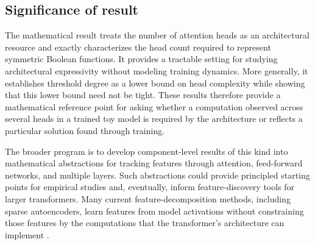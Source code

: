 \documentclass{article}
\theoremstyle{definition}
\theoremstyle{plain}
\begin{document}
\subsection{Significance of result}


%
%

The mathematical result treats the number of attention heads as an architectural resource and exactly characterizes the head count required to represent symmetric Boolean functions. It provides a tractable setting for studying architectural expressivity without modeling training dynamics. More generally, it establishes threshold degree as a lower bound on head complexity while showing that this lower bound need not be tight. These results therefore provide a mathematical reference point for asking whether a computation observed across several heads in a trained toy model is required by the architecture or reflects a particular solution found through training.

The broader program is to develop component-level results of this kind into mathematical abstractions for tracking features through attention, feed-forward networks, and multiple layers. Such abstractions could provide principled starting points for empirical studies and, eventually, inform feature-discovery tools for larger transformers. Many current feature-decomposition methods, including sparse autoencoders, learn features from model activations without constraining those features by the computations that the transformer's architecture can implement \citep{cunningham2023sparseautoencodershighlyinterpretable,shafran2026from}. 
\end{document}
